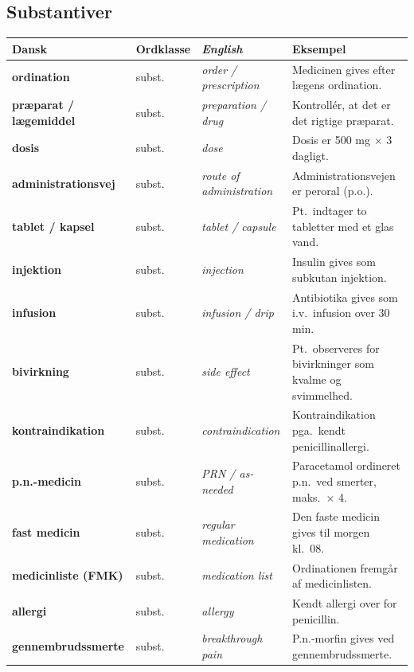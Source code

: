 \documentclass[11pt,a4paper]{report}
\makeatletter
\newcommand{\eng}[1]{\textcolor{en}{\itshape #1}}       %
\newcommand{\da}[1]{\textbf{#1}}
\newenvironment{glos}{%
  \small\renewcommand{\arraystretch}{1.35}
  \begin{longtable}{@{}>{\raggedright\arraybackslash}p{3.3cm}
                        >{\raggedright\arraybackslash}p{1.7cm}
                        >{\raggedright\arraybackslash}p{3.2cm}
                        >{\raggedright\arraybackslash}p{6.0cm}@{}}
  \toprule
  \textbf{Dansk} & \textbf{Ordklasse} & \eng{English} & \textbf{Eksempel} \\ \midrule
  \endhead
}{\bottomrule\end{longtable}}
\makeatother
\begin{document}
\subsection{Substantiver}
\begin{glos}
\da{ordination} & subst. & \eng{order / prescription} & Medicinen gives efter lægens ordination. \\
\da{præparat / lægemiddel} & subst. & \eng{preparation / drug} & Kontrollér, at det er det rigtige præparat. \\
\da{dosis} & subst. & \eng{dose} & Dosis er 500 mg $\times$ 3 dagligt. \\
\da{administrationsvej} & subst. & \eng{route of administration} & Administrationsvejen er peroral (p.o.). \\
\da{tablet / kapsel} & subst. & \eng{tablet / capsule} & Pt.\ indtager to tabletter med et glas vand. \\
\da{injektion} & subst. & \eng{injection} & Insulin gives som subkutan injektion. \\
\da{infusion} & subst. & \eng{infusion / drip} & Antibiotika gives som i.v.\ infusion over 30 min. \\
\da{bivirkning} & subst. & \eng{side effect} & Pt.\ observeres for bivirkninger som kvalme og svimmelhed. \\
\da{kontraindikation} & subst. & \eng{contraindication} & Kontraindikation pga.\ kendt penicillinallergi. \\
\da{p.n.-medicin} & subst. & \eng{PRN / as-needed} & Paracetamol ordineret p.n.\ ved smerter, maks.\ $\times$ 4. \\
\da{fast medicin} & subst. & \eng{regular medication} & Den faste medicin gives til morgen kl.\ 08. \\
\da{medicinliste (FMK)} & subst. & \eng{medication list} & Ordinationen fremgår af medicinlisten. \\
\da{allergi} & subst. & \eng{allergy} & Kendt allergi over for penicillin. \\
\da{gennembrudssmerte} & subst. & \eng{breakthrough pain} & P.n.-morfin gives ved gennembrudssmerte. \\
\end{glos}
\end{document}
